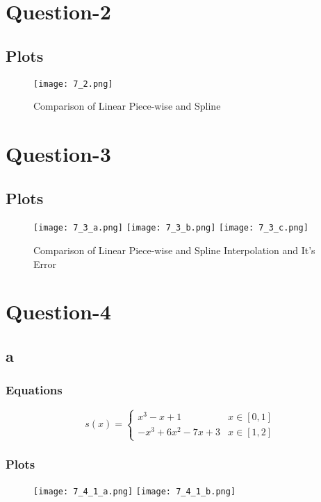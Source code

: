 \documentclass{article}
\begin{document}
\section{Question-2}
\subsection{Plots}
\begin{figure}[!h]
\centering
\texttt{[image: 7\_2.png]}
\caption{Comparison of Linear Piece-wise and Spline}
\end{figure}
\newpage

\section{Question-3}
\subsection{Plots}
\begin{figure}[!h]
\texttt{[image: 7\_3\_a.png]}
\texttt{[image: 7\_3\_b.png]}
\texttt{[image: 7\_3\_c.png]}
\caption{Comparison of Linear Piece-wise and Spline Interpolation and It's Error}
\end{figure}
\newpage

\section{Question-4}
\subsection{a}
\subsubsection{Equations}
$$
s(x) = \left\{
        \begin{array}{ll}
            x^{3} - x + 1 & x\in [0,1]\\
            - x^{3} + 6 x^{2} - 7 x + 3 & x\in [1,2]
        \end{array}
    \right.
$$

\subsubsection{Plots}
\begin{figure}[H]
\centering
\texttt{[image: 7\_4\_1\_a.png]}
\texttt{[image: 7\_4\_1\_b.png]}
\caption{}
\end{figure}
\newpage
\end{document}
